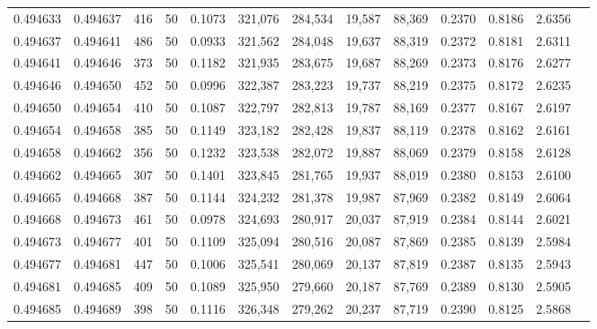 \begin{tabular}{rrrrrrrrrrrrr}
0.494633 & 0.494637 &   416 &  50 &                                     0.1073 & 321,076 & 284,534 &  19,587 &  88,369 & 0.2370 & 0.8186 & 2.6356 \\
0.494637 & 0.494641 &   486 &  50 &                                     0.0933 & 321,562 & 284,048 &  19,637 &  88,319 & 0.2372 & 0.8181 & 2.6311 \\
0.494641 & 0.494646 &   373 &  50 &                                     0.1182 & 321,935 & 283,675 &  19,687 &  88,269 & 0.2373 & 0.8176 & 2.6277 \\
0.494646 & 0.494650 &   452 &  50 &                                     0.0996 & 322,387 & 283,223 &  19,737 &  88,219 & 0.2375 & 0.8172 & 2.6235 \\
0.494650 & 0.494654 &   410 &  50 &                                     0.1087 & 322,797 & 282,813 &  19,787 &  88,169 & 0.2377 & 0.8167 & 2.6197 \\
0.494654 & 0.494658 &   385 &  50 &                                     0.1149 & 323,182 & 282,428 &  19,837 &  88,119 & 0.2378 & 0.8162 & 2.6161 \\
0.494658 & 0.494662 &   356 &  50 &                                     0.1232 & 323,538 & 282,072 &  19,887 &  88,069 & 0.2379 & 0.8158 & 2.6128 \\
0.494662 & 0.494665 &   307 &  50 &                                     0.1401 & 323,845 & 281,765 &  19,937 &  88,019 & 0.2380 & 0.8153 & 2.6100 \\
0.494665 & 0.494668 &   387 &  50 &                                     0.1144 & 324,232 & 281,378 &  19,987 &  87,969 & 0.2382 & 0.8149 & 2.6064 \\
0.494668 & 0.494673 &   461 &  50 &                                     0.0978 & 324,693 & 280,917 &  20,037 &  87,919 & 0.2384 & 0.8144 & 2.6021 \\
0.494673 & 0.494677 &   401 &  50 &                                     0.1109 & 325,094 & 280,516 &  20,087 &  87,869 & 0.2385 & 0.8139 & 2.5984 \\
0.494677 & 0.494681 &   447 &  50 &                                     0.1006 & 325,541 & 280,069 &  20,137 &  87,819 & 0.2387 & 0.8135 & 2.5943 \\
0.494681 & 0.494685 &   409 &  50 &                                     0.1089 & 325,950 & 279,660 &  20,187 &  87,769 & 0.2389 & 0.8130 & 2.5905 \\
0.494685 & 0.494689 &   398 &  50 &                                     0.1116 & 326,348 & 279,262 &  20,237 &  87,719 & 0.2390 & 0.8125 & 2.5868 \\

\end{tabular}

